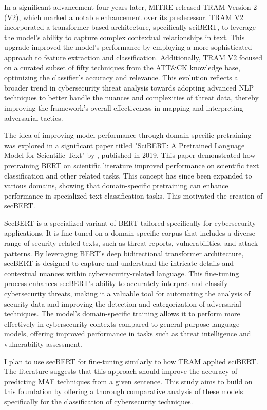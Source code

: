 \documentclass[11pt]{article}
\begin{document}
In a significant advancement four years later, MITRE released TRAM Version 2 (V2), which marked a notable enhancement over its predecessor. TRAM V2 incorporated a transformer-based architecture, specifically sciBERT, to leverage the model's ability to capture complex contextual relationships in text. This upgrade improved the model's performance by employing a more sophisticated approach to feature extraction and classification. Additionally, TRAM V2 focused on a curated subset of fifty techniques from the ATT\&CK knowledge base, optimizing the classifier’s accuracy and relevance. This evolution reflects a broader trend in cybersecurity threat analysis towards adopting advanced NLP techniques to better handle the nuances and complexities of threat data, thereby improving the framework’s overall effectiveness in mapping and interpreting adversarial tactics.

The idea of improving model performance through domain-specific pretraining was explored in a significant paper titled "SciBERT: A Pretrained Language Model for Scientific Text" by \cite{beltagy2019scibert}, published in 2019. This paper demonstrated how pretraining BERT on scientific literature improved performance on scientific text classification and other related tasks. This concept has since been expanded to various domains, showing that domain-specific pretraining can enhance performance in specialized text classification tasks. This motivated the creation of secBERT. 

SecBERT is a specialized variant of BERT tailored specifically for cybersecurity applications. It is fine-tuned on a domain-specific corpus that includes a diverse range of security-related texts, such as threat reports, vulnerabilities, and attack patterns. By leveraging BERT’s deep bidirectional transformer architecture, secBERT is designed to capture and understand the intricate details and contextual nuances within cybersecurity-related language. This fine-tuning process enhances secBERT’s ability to accurately interpret and classify cybersecurity threats, making it a valuable tool for automating the analysis of security data and improving the detection and categorization of adversarial techniques. The model’s domain-specific training allows it to perform more effectively in cybersecurity contexts compared to general-purpose language models, offering improved performance in tasks such as threat intelligence and vulnerability assessment.

I plan to use secBERT for fine-tuning similarly to how TRAM applied sciBERT. The literature suggests that this approach should improve the accuracy of predicting MAF techniques from a given sentence. This study aims to build on this foundation by offering a thorough comparative analysis of these models specifically for the classification of cybersecurity techniques.
\end{document}
